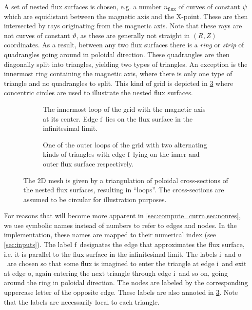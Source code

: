 \documentclass[a4paper, twoside, 10pt, english]{article}
\numberwithin{equation}{section}
\let\temp\varrho
\let\varrho\rho
\let\rho\temp
\let\temp\vartheta
\let\vartheta\theta
\let\theta\temp
\let\temp\varphi
\let\varphi\phi
\let\phi\temp
\newcommand*\fs{\ensuremath{\textrm{f}}}  %
\newcommand*\inw{\ensuremath{\textrm{i}}}  %
\newcommand*\out{\ensuremath{\textrm{o}}}  %
\begin{document}
A set of nested flux surfaces is chosen, e.g. a number $n_{\text{flux}}$ of curves of constant $\psi$ which are equidistant between the magnetic axis and the X-point. These are then intersected by rays originating from the magnetic axis. Note that these rays are not curves of constant $\theta$, as these are generally not straight in $(R, Z)$ coordinates. As a result, between any two flux surfaces there is a \emph{ring} or \emph{strip} of quadrangles going around in poloidal direction. These quadrangles are then diagonally split into triangles, yielding two types of triangles. An exception is the innermost ring containing the magnetic axis, where there is only one type of triangle and no quadrangles to split. This kind of grid is depicted in \cref{fig:grid} where concentric circles are used to illustrate the nested flux surfaces.
\begin{figure}[bth]
  \centering
  \begin{subfigure}[b]{0.33\textwidth}
    \centering
    
    \caption{The innermost loop of the grid with the magnetic axis at its center. Edge \fs\ lies on the flux surface in the infinitesimal limit.}
    \label{fig:grid0}
  \end{subfigure}
  \quad
  \begin{subfigure}[b]{0.5\textwidth}
    \centering
    
    \caption{One of the outer loops of the grid with two alternating kinds of triangles with edge \fs\ lying on the inner and outer flux surface respectively.}
    \label{fig:grid1}
  \end{subfigure}
  \caption{The 2D mesh is given by a triangulation of poloidal cross-sections of the nested flux surfaces, resulting in \enquote{loops}. The cross-sections are assumed to be circular for illustration purposes.}
  \label{fig:grid}
\end{figure}

For reasons that will become more apparent in \cref{sec:compute_currn,sec:nonres}, we use symbolic names instead of numbers to refer to edges and nodes. In the implementation, these names are mapped to their numerical index (see \cref{sec:inputs}). The label \fs\ designates the edge that approximates the flux surface, i.e. it is parallel to the flux surface in the infinitesimal limit. The labels \inw\ and \out\ are chosen so that some flux is imagined to enter the triangle at edge \inw\ and exit at edge \out, again entering the next triangle through edge \inw\ and so on, going around the ring in poloidal direction. The nodes are labeled by the corresponding uppercase letter of the opposite edge. These labels are also annoted in \cref{fig:grid}. Note that the labels are necessarily local to each triangle.
\end{document}

